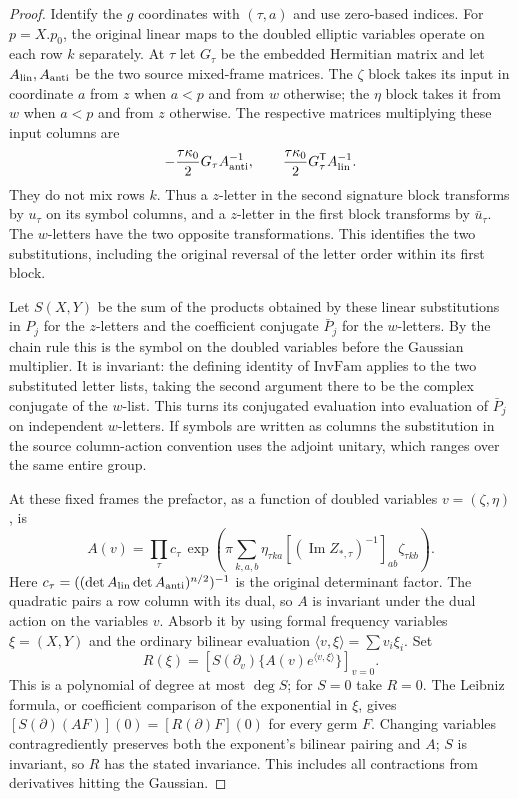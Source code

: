 \begin{proof}
Identify the $g$ coordinates with $(\tau,a)$ and use zero-based
indices. For $p=X.p_0$, the original linear maps to the doubled
elliptic variables operate on each row $k$ separately. At $\tau$
let $G_\tau$ be the embedded Hermitian matrix and let
$A_{\rm lin},A_{\rm anti}$ be the two source mixed-frame matrices.
The $\zeta$ block takes its input in coordinate $a$ from $z$ when
$a<p$ and from $w$ otherwise; the $\eta$ block takes it from $w$
when $a<p$ and from $z$ otherwise. The respective matrices
multiplying these input columns are
\[
  -\frac{\tau\kappa_0}{2}G_\tau A_{\rm anti}^{-1},
  \qquad
   \frac{\tau\kappa_0}{2}G_\tau^{\mathsf T} A_{\rm lin}^{-1}.
\]
They do not mix rows $k$. Thus a $z$-letter in the second
signature block transforms by $u_\tau$ on its symbol columns, and
a $z$-letter in the first block transforms by $\bar u_\tau$.
The $w$-letters have the two opposite transformations. This
identifies the two substitutions, including the original reversal
of the letter order within its first block.

Let $S(X,Y)$ be the sum of the products obtained by these linear
substitutions in $P_j$ for the $z$-letters and the
coefficient conjugate $\bar P_j$ for the $w$-letters.
By the chain rule this is the symbol on the doubled variables
before the Gaussian multiplier. It is invariant: the defining
identity of $\mathrm{InvFam}$ applies to the two substituted
letter lists, taking the second argument there to be the complex
conjugate of the $w$-list. This turns its conjugated evaluation
into evaluation of $\bar P_j$ on independent $w$-letters. If
symbols are written as columns the substitution in the source
column-action convention uses the adjoint unitary, which ranges
over the same entire group.

At these fixed frames the prefactor, as a function of doubled
variables $v=(\zeta,\eta)$, is
\[
 A(v)=\prod_\tau c_\tau\,
   \exp\!\left(\pi\sum_{k,a,b}
    \eta_{\tau ka}[(\operatorname{Im}Z_{*,\tau})^{-1}]_{ab}
                      \zeta_{\tau kb}\right).
\]
Here $c_\tau=((\det A_{\rm lin}\det A_{\rm anti})^{n/2})^{-1}$
is the original determinant factor. The quadratic pairs a row
column with its dual, so $A$ is invariant under the dual action
on the variables $v$. Absorb it by using formal frequency
variables $\xi=(X,Y)$ and the ordinary bilinear evaluation
$\langle v,\xi\rangle=\sum v_i\xi_i$. Set
\[
 R(\xi)=
 [S(\partial_v)\{A(v)e^{\langle v,\xi\rangle}\}]_{v=0}.
\]
This is a polynomial of degree at most $\deg S$; for $S=0$ take
$R=0$. The Leibniz formula, or coefficient comparison of the
exponential in $\xi$, gives
$[S(\partial)(AF)](0)=[R(\partial)F](0)$ for every germ $F$.
Changing variables contragrediently preserves both the exponent's
bilinear pairing and $A$; $S$ is invariant, so $R$ has the stated
invariance. This includes all contractions from derivatives hitting
the Gaussian.
\end{proof}


